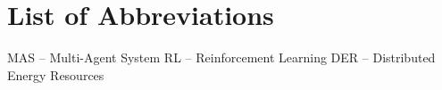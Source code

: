 \chapter*{List of Abbreviations}

MAS – Multi-Agent System
RL – Reinforcement Learning
DER – Distributed Energy Resources